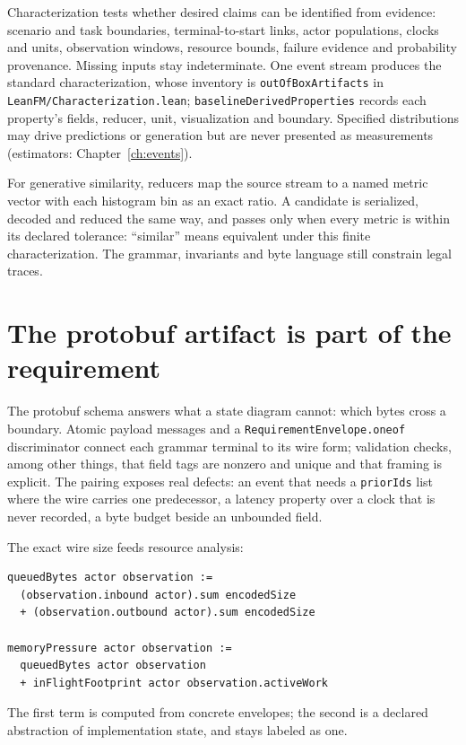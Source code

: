 Characterization tests whether desired claims can be identified from evidence:
scenario and task boundaries, terminal-to-start links, actor populations, clocks
and units, observation windows, resource bounds, failure evidence and probability
provenance. Missing inputs stay indeterminate. One event stream produces the
standard characterization, whose inventory is \texttt{outOfBoxArtifacts} in
\texttt{LeanFM/Characterization.lean}; \texttt{baselineDerivedProperties} records
each property's fields, reducer, unit, visualization and boundary. Specified
distributions may drive predictions or generation but are never presented as
measurements (estimators: Chapter~\ref{ch:events}).

For generative similarity, reducers map the source stream to a named metric
vector with each histogram bin as an exact ratio. A candidate is serialized,
decoded and reduced the same way, and passes only when every metric is within its
declared tolerance: ``similar'' means equivalent under this finite
characterization. The grammar, invariants and byte language still constrain
legal traces.

\section{The protobuf artifact is part of the requirement}

The protobuf schema answers what a state diagram cannot: which bytes cross a
boundary. Atomic payload messages and a \texttt{RequirementEnvelope.oneof}
discriminator connect each grammar terminal to its wire form; validation checks,
among other things, that field tags are nonzero and unique and that framing is
explicit. The pairing exposes real defects: an event that needs a
\texttt{priorIds} list where the wire carries one predecessor, a latency property
over a clock that is never recorded, a byte budget beside an unbounded field.

The exact wire size feeds resource analysis:

\begin{lstlisting}
queuedBytes actor observation :=
  (observation.inbound actor).sum encodedSize
  + (observation.outbound actor).sum encodedSize

memoryPressure actor observation :=
  queuedBytes actor observation
  + inFlightFootprint actor observation.activeWork
\end{lstlisting}

The first term is computed from concrete envelopes; the second is a declared
abstraction of implementation state, and stays labeled as one.

